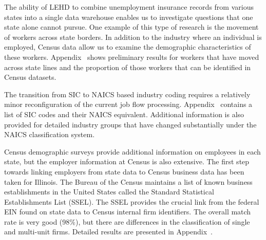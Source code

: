%
%

The ability of LEHD to combine unemployment insurance records from various 
states into a single data warehouse enables us to investigate questions that 
one state alone cannot pursue. One example of this type of research is the 
movement of workers across state borders. In addition to the industry where 
an individual is employed, Census data allow us to examine the demographic 
characteristics of these workers. Appendix~ shows preliminary results for 
workers that have moved across state lines and the proportion of those 
workers that can be identified in Census datasets.

The transition from SIC to NAICS based industry coding requires a relatively 
minor reconfiguration of the current job flow processing. Appendix~ 
contains a list of SIC codes and their NAICS equivalent. Additional 
information is also provided for detailed industry groups that have changed 
substantially under the NAICS classification system.

Census demographic surveys provide additional information on employees in 
each state, but the employer information at Census is also extensive. The 
first step towards linking employers from state data to Census business data 
has been taken for Illinois. The Bureau of the Census maintains a list of 
known business establishments in the United States called the Standard 
Statistical Establishments List (SSEL). The SSEL provides the crucial link 
from the federal EIN found on state data to Census internal firm 
identifiers. The overall match rate is very good (98{\%}), but there are 
differences in the classification of single and multi-unit firms. Detailed 
results are presented in Appendix~. 

